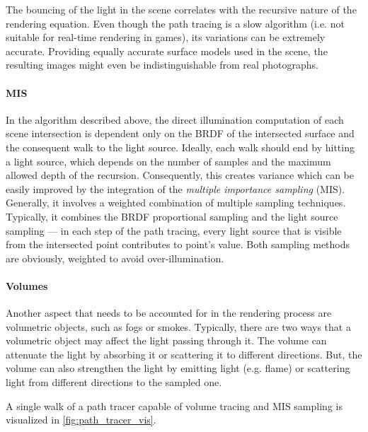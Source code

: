 The bouncing of the light in the scene correlates with the recursive nature of the rendering equation. Even though the path tracing is a slow algorithm (i.e. not suitable for real-time rendering in games), its variations can be extremely accurate. Providing equally accurate surface models used in the scene, the resulting images might even be indistinguishable from real photographs. 


\paragraph{MIS}

In the algorithm described above, the direct illumination computation of each scene intersection is dependent only on the BRDF of the intersected surface and the consequent walk to the light source. Ideally, each walk should end by hitting a light source, which depends on the number of samples and the maximum allowed depth of the recursion. Consequently, this creates variance which can be easily improved by the integration of the \emph{multiple importance sampling} (MIS). Generally, it involves a weighted combination of multiple sampling techniques. Typically, it combines the BRDF proportional sampling and the light source sampling --- in each step of the path tracing, every light source that is visible from the intersected point contributes to point's value. Both sampling methods are obviously, weighted to avoid over-illumination. 

\paragraph{Volumes}

Another aspect that needs to be accounted for in the rendering process are volumetric objects, such as fogs or smokes. Typically, there are two ways that a volumetric object may affect the light passing through it. The volume can attenuate the light by absorbing it or scattering it to different directions. But, the volume can also strengthen the light by emitting light (e.g. flame) or scattering light from different directions to the sampled one.

A single walk of a path tracer capable of volume tracing and MIS sampling is visualized in \autoref{fig:path_tracer_vis}.

